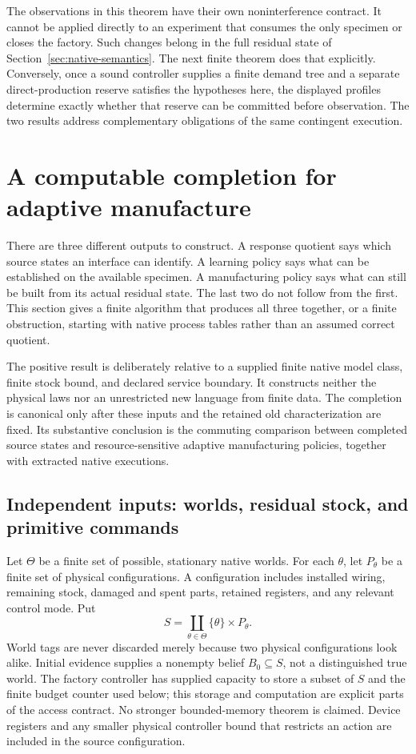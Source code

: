 \documentclass[11pt]{article}
\theoremstyle{definition}
\theoremstyle{remark}
\begin{document}
The observations in this theorem have their own noninterference contract.
It cannot be applied directly to an experiment that consumes the only
specimen or closes the factory. Such changes belong in the full residual
state of Section~\ref{sec:native-semantics}. The next finite theorem does
that explicitly. Conversely, once a sound controller supplies a finite
demand tree and a separate direct-production reserve satisfies the
hypotheses here, the displayed profiles determine exactly whether that
reserve can be committed before observation. The two results address
complementary obligations of the same contingent execution.


\section{A computable completion for adaptive manufacture}
\label{msc:sec:completion}

There are three different outputs to construct. A response quotient says
which source states an interface can identify. A learning policy says what
can be established on the available specimen. A manufacturing policy says
what can still be built from its actual residual state. The last two do not
follow from the first. This section gives a finite algorithm that produces
all three together, or a finite obstruction, starting with native process
tables rather than an assumed correct quotient.

The positive result is deliberately relative to a supplied finite native
model class, finite stock bound, and declared service boundary. It constructs
neither the physical laws nor an unrestricted new language from finite data.
The completion is canonical only after these inputs and the retained old
characterization are fixed. Its substantive conclusion is the commuting
comparison between completed source states and resource-sensitive adaptive
manufacturing policies, together with extracted native executions.

\subsection{Independent inputs: worlds, residual stock, and primitive commands}
Let $\Theta$ be a finite set of possible, stationary native worlds. For each
$\theta$, let $P_\theta$ be a finite set of physical configurations. A
configuration includes installed wiring, remaining stock, damaged and spent
parts, retained registers, and any relevant control mode. Put
\[
 S=\coprod_{\theta\in\Theta}\{\theta\}\times P_\theta.
\]
World tags are never discarded merely because two physical configurations
look alike. Initial evidence supplies a nonempty belief $B_0\subseteq S$,
not a distinguished true world. The factory controller has supplied capacity to store a subset of $S$
and the finite budget counter used below; this storage and computation are
explicit parts of the access contract. No stronger bounded-memory theorem
is claimed. Device registers and any smaller physical controller bound
that restricts an action are included in the source configuration.
\end{document}
